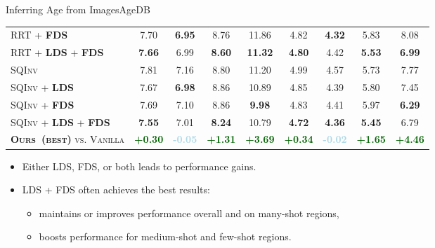 \begin{frame}{Inferring Age from Images}{AgeDB}
\begin{table}[t]
\begin{center}
{\begin{tabular}{l|cccc|cccc}
					\textsc{RRT} + \textbf{\textsc{FDS}}     & {7.70} & \textbf{6.95} & {8.76}   & {11.86} & {4.82} & \textbf{4.32} & {5.83}   & {8.08}  \\[1.2pt]
					\textsc{RRT} + \textbf{\textsc{LDS}} + \textbf{\textsc{FDS}}     & \textbf{7.66} & 6.99 & \textbf{8.60}   & \textbf{11.32} & \textbf{4.80} & 4.42 & \textbf{5.53}   & \textbf{6.99}  \\ \midrule\midrule
					\textsc{SQInv}      & 7.81 & 7.16 & 8.80   & 11.20 & 4.99 & 4.57 & 5.73   & 7.77  \\[1.2pt]
					\textsc{SQInv} + \textbf{\textsc{LDS}} & 7.67 & \textbf{6.98} & 8.86   & 10.89 & 4.85 & {4.39} &  5.80  & {7.45}  \\[1.2pt]
					\textsc{SQInv} + \textbf{\textsc{FDS}} & 7.69 & 7.10 & 8.86   & \textbf{9.98} & 4.83 & {4.41} &  5.97  & \textbf{6.29}  \\[1.2pt]
					\textsc{SQInv} + \textbf{\textsc{LDS}} + \textbf{\textsc{FDS}} & \textbf{7.55} &  7.01  & \textbf{8.24}   & 10.79 & \textbf{4.72} & \textbf{4.36} & \textbf{5.45}  & {6.79}  \\ \midrule\midrule
					\textsc{\textbf{Ours~(best)} vs. Vanilla}   & \textcolor{darkgreen}{\textbf{+0.30}} & \textcolor{lightblue}{\textbf{-0.05}} & \textcolor{darkgreen}{\textbf{+1.31}} & \textcolor{darkgreen}{\textbf{+3.69}} & \textcolor{darkgreen}{\textbf{+0.34}} & \textcolor{lightblue}{\textbf{-0.02}} & \textcolor{darkgreen}{\textbf{+1.65}} & \textcolor{darkgreen}{\textbf{+4.46}} \\
					\bottomrule[1.5pt]
				\end{tabular}
			}
		\end{center}
	\end{table}
	\begin{itemize}\fontsize{7pt}{7.2}\selectfont
		\item Either LDS, FDS, or both leads to performance gains.
		\item LDS + FDS often achieves the best results:
		\begin{itemize}\fontsize{7pt}{7.2}\selectfont
			\item maintains or improves performance overall
			and on many-shot regions,
			\item boosts performance for medium-shot and few-shot regions.
		\end{itemize}
	\end{itemize}
\end{frame}

